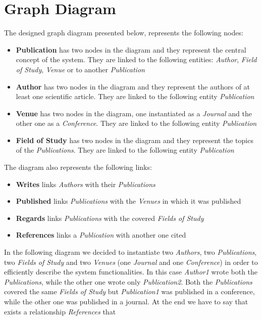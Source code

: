 \documentclass{Configuration_Files/PoliMi3i_thesis}
\begin{document}
\chapter{Graph Diagram}
The designed graph diagram presented below, represents the following nodes:
\begin{itemize}
    \item \textbf{Publication} has two nodes in the diagram and they represent the central concept of the system. They are
        linked to the following entities: \emph{Author}, \emph{Field of Study}, \emph{Venue} or to another \emph{Publication}
    \item \textbf{Author} has two nodes in the diagram and they represent the authors of at least one scientific article.
        They are linked to the following entity \emph{Publication}
    \item \textbf{Venue} has two nodes in the diagram, one instantiated as a \emph{Journal} and the other one as a 
        \emph{Conference}. They are linked to the following entity \emph{Publication}
    \item \textbf{Field of Study} has two nodes in the diagram and they represent the topics of the \emph{Publications}. 
        They are linked to the following entity \emph{Publication}
\end{itemize}
\bigskip
The diagram also represents the following links:
\begin{itemize}
    \item \textbf{Writes} links \emph{Authors} with their \emph{Publications}
    \item \textbf{Published} links \emph{Publications} with the \emph{Venues} in which it was published
    \item \textbf{Regards} links \emph{Publications} with the covered \emph{Fields of Study}
    \item \textbf{References} links a \emph{Publication} with another one cited
\end{itemize}
\bigskip
In the following diagram we decided to instantiate two \emph{Authors}, two \emph{Publications}, two \emph{Fields of Study} and
two \emph{Venues} (one \emph{Journal} and one \emph{Conference}) in order to efficiently describe the system functionalities. \newline
In this case \emph{Author1} wrote both the \emph{Publications}, while the other one wrote only \emph{Publication2}.
Both the \emph{Publications} covered the same \emph{Fields of Study} but \emph{Publication1} was published in a conference,
while the other one was published in a journal. At the end we have to say that exists a relationship \emph{References} that
\end{document}
